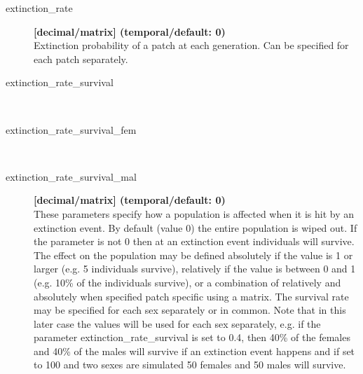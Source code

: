 \documentclass[letterpaper,12pt,oneside]{book}
\begin{document}
\begin{description}
\item[extinction\_rate] \textbf{[decimal/matrix] (temporal/default: 0)}\\
Extinction probability of a patch at each generation. Can be specified for each patch separately.

\item[extinction\_rate\_survival]\hspace*{\fill}\\
\vspace{-9mm}
\item[extinction\_rate\_survival\_fem]\hspace*{\fill}\\
\vspace{-9mm}
\item[extinction\_rate\_survival\_mal] \textbf{[decimal/matrix] (temporal/default: 0)}\\
These parameters specify how a population is affected when it is hit by an extinction event. By default (value 0) the entire population is wiped out. If the parameter is not 0 then at an extinction event individuals will survive. The effect on the population may be defined absolutely if the value is 1 or larger (e.g. 5 individuals survive), relatively if the value is between 0 and 1 (e.g. 10\% of the individuals survive), or a combination of relatively and absolutely when specified patch specific  using a matrix. The survival rate may be specified for each sex separately or in common. Note that in this later case the values will be used for each sex separately, e.g. if the parameter \textsf{extinction\_rate\_survival} is set to 0.4, then 40\% of the females and 40\% of the males will survive if an extinction event happens and if set to 100 and two sexes are simulated 50 females and 50 males will survive.

\end{description}

\newpage
\end{document}
